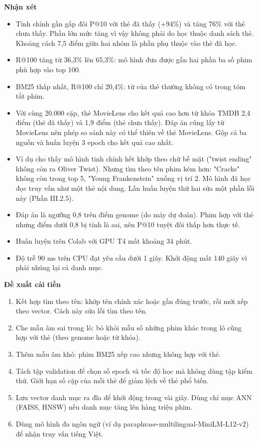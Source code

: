 \documentclass[12pt,a4paper]{article}
\providecommand{\tightlist}{\setlength{\itemsep}{0pt}\setlength{\parskip}{0pt}}
\newcommand{\lbl}[1]{\Needspace{6\baselineskip}\textbf{#1}\par\nopagebreak}
\begin{document}
\lbl{Nhận xét}

\begin{itemize}
\tightlist
\item Tinh chỉnh gần gấp đôi P@10 với thẻ đã thấy (+94\%) và tăng 76\% với thẻ chưa thấy. Phần lớn mức tăng vì vậy không phải do học thuộc danh sách thẻ. Khoảng cách 7,5 điểm giữa hai nhóm là phần phụ thuộc vào thẻ đã học.
\item R@100 tăng từ 36,3\% lên 65,3\%: mô hình đưa được gần hai phần ba số phim phù hợp vào top 100.
\item BM25 thấp nhất, R@100 chỉ 20,4\%: từ của thẻ thường không có trong tóm tắt phim.
\item Với cùng 20.000 cặp, thẻ MovieLens cho kết quả cao hơn từ khóa TMDB 2,4 điểm (thẻ đã thấy) và 1,9 điểm (thẻ chưa thấy). Đáp án cũng lấy từ MovieLens nên phép so sánh này có thể thiên về thẻ MovieLens. Gộp cả ba nguồn và huấn luyện 3 epoch cho kết quả cao nhất.
\item Ví dụ cho thấy mô hình tinh chỉnh hết khớp theo chữ bề mặt ("twist ending" không còn ra Oliver Twist). Nhưng tìm theo tên phim kém hơn: "Cracks" không còn trong top 5, "Young Frankenstein" xuống vị trí 2. Mô hình đã học đọc truy vấn như một thẻ nội dung. Lần huấn luyện thứ hai sửa một phần lỗi này (Phần III.2.5).
\item Đáp án là ngưỡng 0,8 trên điểm genome (do máy dự đoán). Phim hợp với thẻ nhưng điểm dưới 0,8 bị tính là sai, nên P@10 tuyệt đối thấp hơn thực tế.
\item Huấn luyện trên Colab với GPU T4 mất khoảng 34 phút.
\item Độ trễ 90 ms trên CPU đạt yêu cầu dưới 1 giây. Khởi động mất 140 giây vì phải nhúng lại cả danh mục.
\end{itemize}

\lbl{Đề xuất cải tiến}

\begin{enumerate}
\def\labelenumi{\arabic{enumi}.}
\tightlist
\item Kết hợp tìm theo tên: khớp tên chính xác hoặc gần đúng trước, rồi mới xếp theo vector. Cách này sửa lỗi tìm theo tên.
\item Che mẫu âm sai trong lô: bỏ khỏi mẫu số những phim khác trong lô cũng hợp với thẻ (theo genome hoặc từ khóa).
\item Thêm mẫu âm khó: phim BM25 xếp cao nhưng không hợp với thẻ.
\item Tách tập validation để chọn số epoch và tốc độ học mà không dùng tập kiểm thử. Giới hạn số cặp của mỗi thẻ để giảm lệch về thẻ phổ biến.
\item Lưu vector danh mục ra đĩa để khởi động trong vài giây. Dùng chỉ mục ANN (FAISS, HNSW) nếu danh mục tăng lên hàng triệu phim.
\item Dùng mô hình đa ngôn ngữ (ví dụ paraphrase-multilingual-MiniLM-L12-v2) để nhận truy vấn tiếng Việt.
\end{enumerate}
\end{document}
